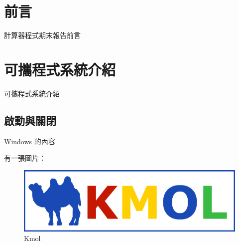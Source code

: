 \documentclass[12pt,,]{report}
\begin{document}
\begingroup
    \renewcommand{\contentsname}{\center 目錄 \addcontentsline{toc}{chapter}{目錄}}
    \renewcommand{\numberline}[1]{~#1\hspace*{1em}}
        \setcounter{tocdepth}{2}
    \tableofcontents
    \newcommand{\lotlabel}{表}
    \renewcommand{\listtablename}{\center 表目錄 \addcontentsline{toc}{chapter}{表目錄}}
    \renewcommand{\numberline}[1]{\lotlabel~#1\hspace*{1em}}
    \listoftables
    \newcommand{\loflabel}{圖}
    \renewcommand{\listfigurename}{\center 圖目錄 \addcontentsline{toc}{chapter}{圖目錄}}
    \renewcommand{\numberline}[1]{\loflabel~#1\hspace*{1em}}
    \listoffigures
\endgroup

\mainmatter
\hypertarget{ux524dux8a00}{%
\chapter{前言}\label{ux524dux8a00}}

計算器程式期末報告前言

\hypertarget{ux53efux651cux7a0bux5f0fux7cfbux7d71ux4ecbux7d39}{%
\chapter{可攜程式系統介紹}\label{ux53efux651cux7a0bux5f0fux7cfbux7d71ux4ecbux7d39}}

可攜程式系統介紹

\hypertarget{ux555fux52d5ux8207ux95dcux9589}{%
\section{啟動與關閉}\label{ux555fux52d5ux8207ux95dcux9589}}

Windows 的內容

有一張圖片：

\begin{figure}
\centering
\includegraphics{./tex2pdf.4432/e0ef408d9559203849a0aa26f79f9b032b709c7a.png}
\caption{Kmol\label{fig:駱駝}}
\end{figure}
\end{document}
